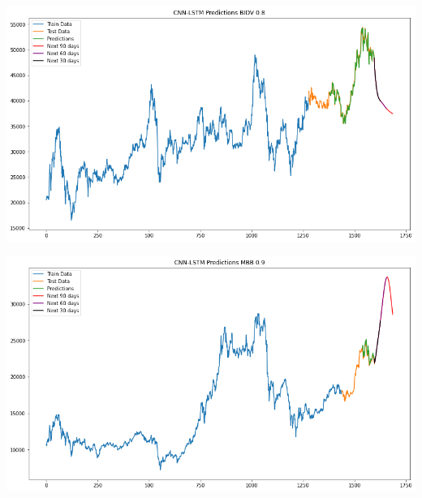 \documentclass[conference]{IEEEtran}
\begin{document}
\begin{minipage}{0.21\textwidth}
    \centering
    \includegraphics[width=\linewidth]{images/CNN-LSTM/CNNLSTM_BIDV_82.png}
    \label{fig:image1}
\end{minipage}
\hfill
\begin{minipage}{0.21\textwidth}
    \centering
    \includegraphics[width=\linewidth]{images/CNN-LSTM/CNNLSTM_BIDV_91.png}
    \label{fig:image2}
\end{minipage}
\end{document}
